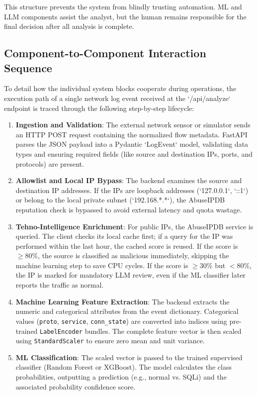 \documentclass[12pt,a4paper]{report}
\begin{document}
This structure prevents the system from blindly trusting automation. ML and
LLM components assist the analyst, but the human remains responsible for the
final decision after all analysis is complete.

\subsection{Component-to-Component Interaction Sequence}

To detail how the individual system blocks cooperate during operations, the execution path of a single network log event received at the `/api/analyze` endpoint is traced through the following step-by-step lifecycle:
\begin{enumerate}[leftmargin=1.5em]
  \item \textbf{Ingestion and Validation}: The external network sensor or simulator sends an HTTP POST request containing the normalized flow metadata. FastAPI parses the JSON payload into a Pydantic `LogEvent` model, validating data types and ensuring required fields (like source and destination IPs, ports, and protocols) are present.
  \item \textbf{Allowlist and Local IP Bypass}: The backend examines the source and destination IP addresses. If the IPs are loopback addresses (`127.0.0.1`, `::1`) or belong to the local private subnet (`192.168.*.*`), the AbuseIPDB reputation check is bypassed to avoid external latency and quota wastage.
  \item \textbf{Tehno-Intelligence Enrichment}: For public IPs, the AbuseIPDB service is queried. The client checks its local cache first; if a query for the IP was performed within the last hour, the cached score is reused. If the score is $\ge 80\%$, the source is classified as malicious immediately, skipping the machine learning step to save CPU cycles. If the score is $\ge 30\%$ but $< 80\%$, the IP is marked for mandatory LLM review, even if the ML classifier later reports the traffic as normal.
  \item \textbf{Machine Learning Feature Extraction}: The backend extracts the numeric and categorical attributes from the event dictionary. Categorical values (\texttt{proto}, \texttt{service}, \texttt{conn\_state}) are converted into indices using pre-trained \texttt{LabelEncoder} bundles. The complete feature vector is then scaled using \texttt{StandardScaler} to ensure zero mean and unit variance.
  \item \textbf{ML Classification}: The scaled vector is passed to the trained supervised classifier (Random Forest or XGBoost). The model calculates the class probabilities, outputting a prediction (e.g., normal vs. SQLi) and the associated probability confidence score.

\end{enumerate}
\end{document}

